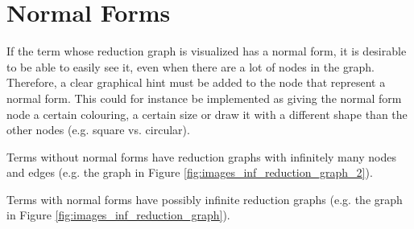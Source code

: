 \section{Normal Forms}

If the term whose reduction graph is visualized has a normal form, it is
desirable to be able to easily see it, even when there are a lot of nodes in
the graph. Therefore, a clear graphical hint must be added to the node that
represent a normal form. This could for instance be implemented as giving the
normal form node a certain colouring, a certain size or draw it with a
different shape than the other nodes (e.g. square vs. circular).

\fact Terms without normal forms have reduction graphs with infinitely many
nodes and edges (e.g. the graph in Figure \ref{fig:images_inf_reduction_graph_2}). 

\fact Terms with normal forms have possibly infinite reduction graphs (e.g.
the graph in Figure \ref{fig:images_inf_reduction_graph}).
